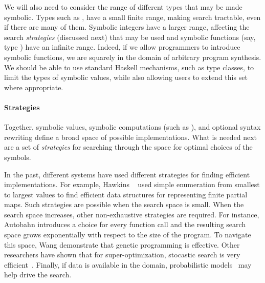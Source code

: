 We will also need to consider the range of different types that may be made symbolic.
Types such as , have a small finite range, making search tractable, even
if there are many of them.   Symbolic integers have a larger range, affecting the search
\emph{strategies} (discussed next) that may be used and symbolic functions (say, type ) have an 
infinite range.  Indeed, if we allow programmers to introduce symbolic functions, we
are squarely in the domain of arbitrary program synthesis.  We should be able to use
standard Haskell mechanisms, such as type classes, to limit the types of symbolic values,
while also allowing users to extend this set where appropriate.


\paragraph*{Strategies}
Together, symbolic values, symbolic computations (such as ),
and optional syntax rewriting define a broad space of possible
implementations.  What is needed next are a set of \emph{strategies}
for searching through the space for optimal choices of the symbols.

In the past, different systems have used different strategies for finding
efficient implementations.  For example, Hawkins \etal~\cite{data-rep-synth} used
simple enumeration from smallest to largest values to find efficient
data structures for representing finite partial maps.  Such strategies are
possible when the search space is small.  When the search space increases,
other non-exhaustive strategies are required.  For instance, Autobahn
introduces a choice for every function call and the resulting search
space grows exponentially with respect to the size of the program.  To
navigate this space, Wang \etal{} demonstrate that genetic programming is effective.
Other researchers have shown that for super-optimization, stocastic search is very
efficient~\cite{stochastic-superopt}.  Finally, if data is available in the domain, probabilistic
models~\cite{probabilistic-netkat} may help drive the search.


